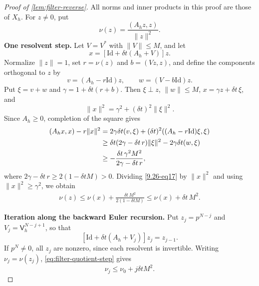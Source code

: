 \documentclass[print,wide,eng]{draft}
\begin{document}
\begin{proof}[Proof of \cref{lem:filter-reverse}]
All norms and inner products in this proof are those of $X_h$. For $z\ne0$, put
$$
\nu(z)=\frac{(A_hz,z)}{\|z\|^2}.
$$
%
\textbf{One resolvent step.}
Let $V=V^*$ with $\|V\|\le M$, and let
$$
x=[\mathrm{Id}+\delta t(A_h+V)]z.
$$
Normalize $\|z\|=1$, set $r=\nu(z)$ and $b=(Vz,z)$, and define the components orthogonal to $z$ by
$$
v=(A_h-r\mathrm{Id})z,\qquad w=(V-b\mathrm{Id})z.
$$
Put $\xi=v+w$ and $\gamma=1+\delta t(r+b)$. Then $\xi\perp z$, $\|w\|\le M$, $x=\gamma z+\delta t\,\xi$, and
$$
\|x\|^2=\gamma^2+(\delta t)^2\|\xi\|^2.
$$
Since $A_h\ge0$, completion of the square gives
\begin{align}\label{9.26-eq17}
	(A_hx,x)-r\|x\|^2
	&=2\gamma\delta t(v,\xi)+(\delta t)^2((A_h-r\mathrm{Id})\xi,\xi)\notag\\
	&\ge\delta t(2\gamma-\delta t\,r)\|\xi\|^2-2\gamma\delta t(w,\xi)\\
	&\ge-\frac{\delta t\,\gamma^2M^2}{2\gamma-\delta t\,r},\notag
\end{align}
where $2\gamma-\delta t\,r\ge2(1-\delta t M)>0$. Dividing \eqref{9.26-eq17} by $\|x\|^2$ and using $\|x\|^2\ge\gamma^2$, we obtain
\begin{align}\label{eq:filter-quotient-step}
	\nu(z)\le\nu(x)+\frac{\delta t\,M^2}{2(1-\delta t M)}
	\le\nu(x)+\delta t\,M^2.
\end{align}

\textbf{Iteration along the backward Euler recursion.}
Put $z_j=p^{N-j}$ and $V_j=\mathsf V_h^{N-j+1}$, so that
%
\begin{equation}\label{9.26-eq18}
[\mathrm{Id}+\delta t(A_h+V_j)]z_j=z_{j-1}.
\end{equation}
%
If $p^N\ne0$, all $z_j$ are nonzero, since each resolvent is invertible. Writing $\nu_j=\nu(z_j)$, \cref{eq:filter-quotient-step} gives
$$
\nu_j\le\nu_0+j\delta t M^2.
$$



\end{proof}
\end{document}
